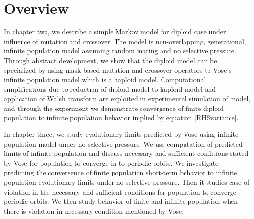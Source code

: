\section{Overview}
In chapter two, we describe a simple Markov model for diploid case under influence of mutation and crossover. 
The model is non-overlapping, generational, infinite population model assuming random mating and no selective pressure. 
Through abstract development, we show that the diploid model can be specialized by using mask based 
mutation and crossover operators to Vose's infinite population model which is a haploid model. Computational 
simplifications due to reduction of diploid model to haploid model and application of Walsh transform 
are exploited in experimental simulation of model, and through the experiment we demonstrate convergence 
of finite diploid population to infinite population behavior implied by equation \ref{RHSvariance}.

In chapter three, we study evolutionary limits predicted by Vose using infinite population model 
under no selective pressure. We use computation of predicted limits
of infinite population and discuss necessary and sufficient conditions stated by Vose for population
to converge in to periodic orbits. We investigate predicting the convergence of finite population 
short-term behavior to infinite population evolutionary limits under no selective pressure. 
Then it studies case of violation in the necessary and sufficient conditions for population 
to converge periodic orbits. We then study behavior of finite and infinite population when there is 
violation in necessary condition mentioned by Vose.






